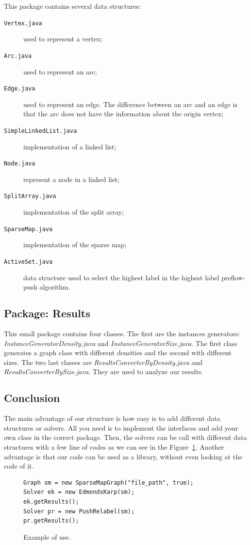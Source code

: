This package contains several data structures: 
\begin{description}
	\item[\texttt{Vertex.java}] used to represent a vertex;
	\item[\texttt{Arc.java}] used to represent an arc;
	\item[\texttt{Edge.java}] used to represent an edge. The difference between an arc and an edge is that the arc does not have the information about the origin vertex;
	\item[\texttt{SimpleLinkedList.java}] implementation of a linked list;
	\item[\texttt{Node.java}] represent a node in a linked list;
	\item[\texttt{SplitArray.java}] implementation of the split array;
	\item[\texttt{SparseMap.java}] implementation of the sparse map;
	\item[\texttt{ActiveSet.java}] data structure used to select the highest label in the highest label preflow-push algorithm.
\end{description}

\subsection{Package: Results}

This small package contains four classes. The first are the instances generators: \textit{InstanceGeneratorDensity.java} and \textit{InstanceGeneratorSize.java}. The first class generates a graph class with different densities and the second with different sizes. The two last classes are \textit{ResultsConverterByDensity.java} and \textit{ResultsConverterBySize.java}. They are used to analyze our results.

\subsection{Conclusion}


The main advantage of our structure is how easy is to add different data structures or solvers. All you need is to implement the interfaces and add your own class in the correct package. Then, the solvers can be call with different data structures with a few line of codes as we can see in the Figure~\ref{simple_code}. Another advantage is that our code can be used as a library, without even looking at the code of it.

\begin{figure}
\begin{lstlisting}
Graph sm = new SparseMapGraph("file_path", true);
Solver ek = new EdmondsKarp(sm);
ek.getResults();
Solver pr = new PushRelabel(sm);
pr.getResults();
\end{lstlisting}
\caption{Example of use.}
\label{simple_code}
\end{figure}

